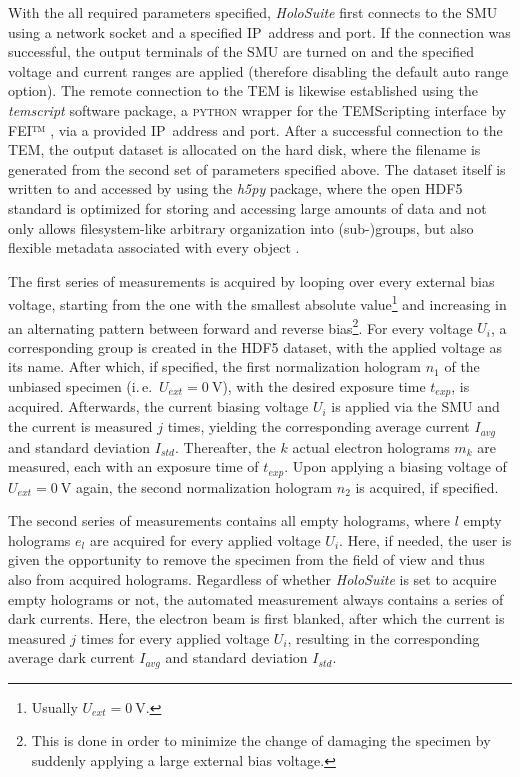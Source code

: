 With the all required parameters specified, \emph{HoloSuite} first connects to the SMU using a network socket and a specified IP~address and port. If the connection was successful, the output terminals of the SMU are turned on and the specified voltage and current ranges are applied (therefore disabling the default auto range option). The remote connection to the TEM is likewise established using the \emph{temscript} software package, a \textsc{python} wrapper for the TEMScripting interface by FEI™ \cite{temscript}, via a provided IP~address and port. After a successful connection to the TEM, the output dataset is allocated on the hard disk, where the filename is generated from the second set of parameters specified above. The dataset itself is written to and accessed by using the \emph{h5py} package, where the open HDF5 standard is optimized for storing and accessing large amounts of data and not only allows filesystem-like arbitrary organization into (sub-)groups, but also flexible metadata associated with every object \cite{Collette2014}.

The first series of measurements is acquired by looping over every external bias voltage, starting from the one with the smallest absolute value\footnote{Usually $U_{\mathit{ext}} = \SI{0}{\volt}$.} and increasing in an alternating pattern between forward and reverse bias\footnote{This is done in order to minimize the change of damaging the specimen by suddenly applying a large external bias voltage.}. For every voltage $U_i$, a corresponding group is created in the HDF5 dataset, with the applied voltage as its name. After which, if specified, the first normalization hologram $n_1$ of the unbiased specimen (i.\,e.\ $U_{\mathit{ext}} = \SI{0}{\volt}$), with the desired exposure time $t_{\mathit{exp}}$, is acquired. Afterwards, the current biasing voltage $U_i$ is applied via the SMU and the current is measured $j$ times, yielding the corresponding average current $I_{\mathit{avg}}$ and standard deviation $I_{\mathit{std}}$. Thereafter, the $k$ actual electron holograms $m_k$ are measured, each with an exposure time of $t_{\mathit{exp}}$. Upon applying a biasing voltage of $U_{\mathit{ext}} = \SI{0}{\volt}$ again, the second normalization hologram $n_2$ is acquired, if specified.

The second series of measurements contains all empty holograms, where $l$ empty holograms $e_l$ are acquired for every applied voltage $U_i$. Here, if needed, the user is given the opportunity to remove the specimen from the field of view and thus also from acquired holograms.
\newpage
Regardless of whether \emph{HoloSuite} is set to acquire empty holograms or not, the automated measurement always contains a series of dark currents. Here, the electron beam is first blanked, after which the current is measured $j$ times for every applied voltage $U_i$, resulting in the corresponding average dark current $I_{\mathit{avg}}$ and standard deviation $I_{\mathit{std}}$.

